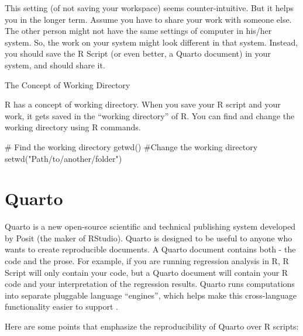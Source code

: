 \documentclass[
  letterpaper,
  paper =a4,
  twoside,
  openright,
  headsepline,
  footsepline,
  listof = totocnumbered,
  chapterprefix = true,
  firstiscover]{scrbook}
\newenvironment{Shaded}{\begin{snugshade}}{\end{snugshade}}
\newcommand{\CommentTok}[1]{\textcolor[rgb]{0.37,0.37,0.37}{#1}}
\newcommand{\FunctionTok}[1]{\textcolor[rgb]{0.28,0.35,0.67}{#1}}
\newcommand{\NormalTok}[1]{\textcolor[rgb]{0.00,0.23,0.31}{#1}}
\newcommand{\StringTok}[1]{\textcolor[rgb]{0.13,0.47,0.30}{#1}}
\begin{document}
This setting (of not saving your workspace) seems counter-intuitive. But
it helps you in the longer term. Assume you have to share your work with
someone else. The other person might not have the same settings of
computer in his/her system. So, the work on your system might look
different in that system. Instead, you should save the R Script (or even
better, a Quarto document) in your system, and should share it.

The Concept of Working Directory

R has a concept of working directory. When you save your R script and
your work, it gets saved in the ``working directory'' of R. You can find
and change the working directory using R commands.

\begin{Shaded}
\begin{Highlighting}[numbers=left,,]
\CommentTok{\# Find the working directory}
\FunctionTok{getwd}\NormalTok{()}
\CommentTok{\#Change the working directory}
\FunctionTok{setwd}\NormalTok{(}\StringTok{"Path/to/another/folder"}\NormalTok{)}
\end{Highlighting}
\end{Shaded}

\hypertarget{quarto}{%
\section{Quarto}\label{quarto}}

Quarto is a new open-source scientific and technical publishing system
developed by Posit (the maker of RStudio). Quarto is designed to be
useful to anyone who wants to create reproducible documents. A Quarto
document contains both - the code and the prose. For example, if you are
running regression analysis in R, R Script will only contain your code,
but a Quarto document will contain your R code and your interpretation
of the regression results. Quarto runs computations into separate
pluggable language ``engines'', which helps make this cross-language
functionality easier to support .

Here are some points that emphasize the reproducibility of Quarto over R
scripts:
\end{document}
